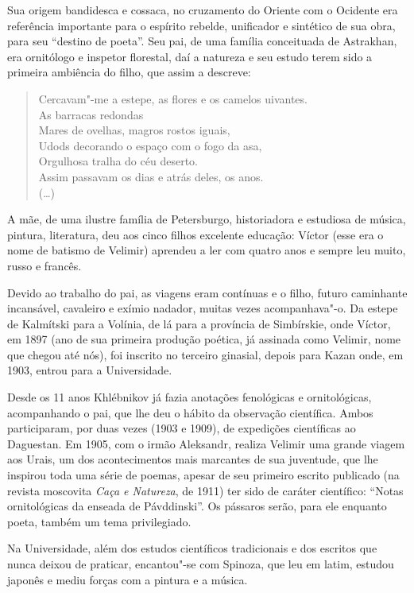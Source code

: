 {Sua origem bandidesca e cossaca, no cruzamento do Oriente com o Ocidente
era referência importante para o espírito rebelde, unificador e
sintético de sua obra, para seu ``destino de poeta''. Seu pai, de uma
família conceituada de Astrakhan, era ornitólogo e inspetor florestal, daí a natureza e seu estudo terem sido a primeira ambiência do filho,
que assim a descreve:

\begin{verse}
Cercavam"-me a estepe, as flores e os \qb{}camelos uivantes. \\
As barracas redondas \\
Mares de ovelhas, magros rostos iguais, \\
Udods decorando o espaço com o fogo da \qb{}asa, \\
Orgulhosa tralha do céu deserto. \\
Assim passavam os dias e atrás deles, os anos. \\
(\ldots{})
\end{verse}

A mãe, de uma ilustre família de Petersburgo, historiadora e estudiosa
de música, pintura, literatura, deu aos cinco filhos excelente educação:
Víctor (esse era o nome de batismo de Velimir) aprendeu a ler com quatro
anos e sempre leu muito, russo e francês.

Devido ao trabalho do pai, as viagens eram contínuas e o filho, futuro
caminhante incansável, cavaleiro e exímio nadador, muitas vezes
acompanhava"-o. Da estepe de Kalmítski para a Volínia, de lá para a
província de Simbírskie, onde Víctor, em 1897 (ano de sua primeira
produção poética, já assinada como Velimir, nome que chegou até nós), foi
inscrito no terceiro ginasial, depois para Kazan onde, em 1903, entrou
para a Universidade.

Desde os 11 anos Khlébnikov já fazia anotações fenológicas e
ornitológicas, acompanhando o pai, que lhe deu o hábito da observação
científica. Ambos participaram, por duas vezes (1903 e 1909), de
expedições científicas ao Daguestan. Em 1905, com o irmão Aleksandr,
realiza Velimir uma grande viagem aos Urais, um dos acontecimentos mais
marcantes de sua juventude, que lhe inspirou toda uma série de poemas,
apesar de seu primeiro escrito publicado (na revista moscovita
\emph{Caça e Natureza}, de 1911) ter sido de caráter científico: ``Notas
ornitológicas da enseada de Pávddinski''. Os pássaros serão, para ele
enquanto poeta, também um tema privilegiado.

Na Universidade, além dos estudos científicos tradicionais e dos
escritos que nunca deixou de praticar, encantou"-se com Spinoza, que leu
em latim, estudou japonês e mediu forças com a pintura e a música.

}
